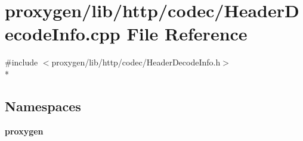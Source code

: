 \section{proxygen/lib/http/codec/\+Header\+Decode\+Info.cpp File Reference}
\label{HeaderDecodeInfo_8cpp}
{\ttfamily \#include $<$proxygen/lib/http/codec/\+Header\+Decode\+Info.\+h$>$}\\*
\subsection*{Namespaces}
\begin{DoxyCompactItemize}
\item 
 {\bf proxygen}
\end{DoxyCompactItemize}
